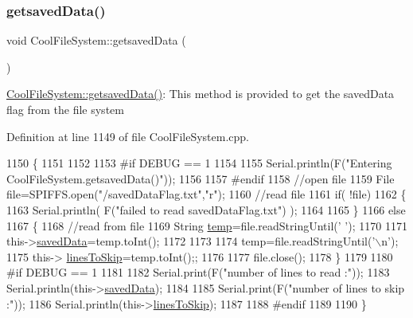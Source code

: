 \subsubsection{\texorpdfstring{getsaved\+Data()}{getsavedData()}}
{\footnotesize\ttfamily void Cool\+File\+System\+::getsaved\+Data (\begin{DoxyParamCaption}{ }\end{DoxyParamCaption})}

\hyperlink{class_cool_file_system_a70701d05e811604af1b531f4f6dc69ed}{Cool\+File\+System\+::getsaved\+Data()}\+: This method is provided to get the saved\+Data flag from the file system 

Definition at line 1149 of file Cool\+File\+System.\+cpp.


\begin{DoxyCode}
1150 \{
1151 
1152 
1153 \textcolor{preprocessor}{#if DEBUG == 1}
1154     
1155     Serial.println(F(\textcolor{stringliteral}{"Entering CoolFileSystem.getsavedData()"}));    
1156     
1157 \textcolor{preprocessor}{#endif}
1158     \textcolor{comment}{//open file}
1159     File file=SPIFFS.open(\textcolor{stringliteral}{"/savedDataFlag.txt"},\textcolor{stringliteral}{"r"});    
1160     \textcolor{comment}{//read file}
1161     \textcolor{keywordflow}{if}( !file)  
1162     \{
1163         Serial.println( F(\textcolor{stringliteral}{"failed to read savedDataFlag.txt"}) );
1164         
1165     \}
1166     \textcolor{keywordflow}{else}
1167     \{       
1168         \textcolor{comment}{//read from file    }
1169         String \hyperlink{_irene3000_8h_a5905d48604152cf57aa6bfa087b49173}{temp}=file.readStringUntil(\textcolor{charliteral}{' '});
1170         
1171         this->\hyperlink{class_cool_file_system_ad9f5b739a32100f5f21270c3d9ee2b1d}{savedData}=temp.toInt();
1172 
1173         
1174         temp=file.readStringUntil(\textcolor{charliteral}{'\(\backslash\)n'});
1175         this-> \hyperlink{class_cool_file_system_a84fdb6057e534b395512463daa28ea3c}{linesToSkip}=temp.toInt();;    
1176         
1177         file.close();   
1178     \}
1179     
1180 \textcolor{preprocessor}{#if DEBUG == 1}
1181 
1182     Serial.print(F(\textcolor{stringliteral}{"number of lines to read :"}));
1183     Serial.println(this->\hyperlink{class_cool_file_system_ad9f5b739a32100f5f21270c3d9ee2b1d}{savedData});
1184     
1185     Serial.print(F(\textcolor{stringliteral}{"number of lines to skip :"}));
1186     Serial.println(this->\hyperlink{class_cool_file_system_a84fdb6057e534b395512463daa28ea3c}{linesToSkip});
1187 
1188 \textcolor{preprocessor}{#endif}
1189     
1190 \}
\end{DoxyCode}
